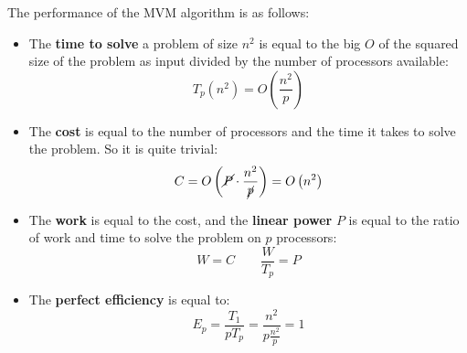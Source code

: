 \newpage

\noindent
The performance of the MVM algorithm is as follows:
\begin{itemize}
    \item The \textbf{time to solve} a problem of size $n^{2}$ is equal to the big $O$ of the squared size of the problem as input divided by the number of processors available:
    \begin{equation*}
        T_{p}\left(n^{2}\right) = O\left(\dfrac{n^{2}}{p}\right)
    \end{equation*}
    
    \item The \textbf{cost} is equal to the number of processors and the time it takes to solve the problem. So it is quite trivial:
    \begin{equation*}
        C = O\left(\cancel{P} \cdot \dfrac{n^{2}}{\cancel{p}}\right) = O\left(n^{2}\right)
    \end{equation*}

    \item The \textbf{work} is equal to the cost, and the \textbf{linear power} $P$ is equal to the ratio of work and time to solve the problem on $p$ processors:
    \begin{equation*}
        W = C \hspace{2em} \dfrac{W}{T_{p}} = P
    \end{equation*}

    \item The \textbf{perfect efficiency} is equal to:
    \begin{equation*}
        E_{p} = \dfrac{T_{1}}{pT_{p}} = \dfrac{n^{2}}{p\frac{n^{2}}{p}} = 1
    \end{equation*}
\end{itemize}